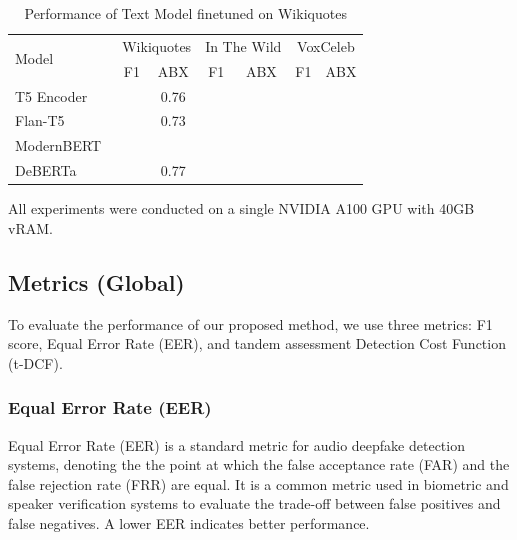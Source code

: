 \documentclass{Interspeech}
\begin{document}
\begin{table}[!htp]\centering
  \scriptsize
  \begin{tabular}{lcccccc}\toprule
      \multirow{2}{*}{Model}       & \multicolumn{2}{c}{Wikiquotes} & \multicolumn{2}{c}{In The Wild} & \multicolumn{2}{c}{VoxCeleb}                  \\\cmidrule{2-7}
                                   & F1                             & ABX                             & F1                           & ABX & F1 & ABX \\\cmidrule{1-7}
      T5 Encoder~\cite{t5}         &                                & 0.76                            &                              &     &    &     \\
      Flan-T5~\cite{flan-t5}       &                                & 0.73                            &                              &     &    &     \\
      ModernBERT~\cite{modernBERT} &                                &                                 &                              &     &    &     \\
      DeBERTa~\cite{deberta}       &                                & 0.77                            &                              &     &    &     \\\midrule
      \bottomrule
  \end{tabular}
  \caption{Performance of Text Model finetuned on Wikiquotes }\label{tab:results_text_model}
\end{table}

All experiments were conducted on a single NVIDIA A100 GPU with 40GB vRAM.

\subsection{Metrics (Global)}
To evaluate the performance of our proposed method, we use three metrics: F1
score, Equal Error Rate (EER), and tandem assessment Detection Cost Function
(t-DCF).

\subsubsection{Equal Error Rate (EER)}
Equal Error Rate (EER) is a standard metric for audio deepfake detection
systems, denoting the the point at which the false acceptance rate (FAR) and
the false rejection rate (FRR) are equal. It is a common metric used in
biometric and speaker verification systems to evaluate the trade-off between
false positives and false negatives. A lower EER indicates better performance.
\end{document}
